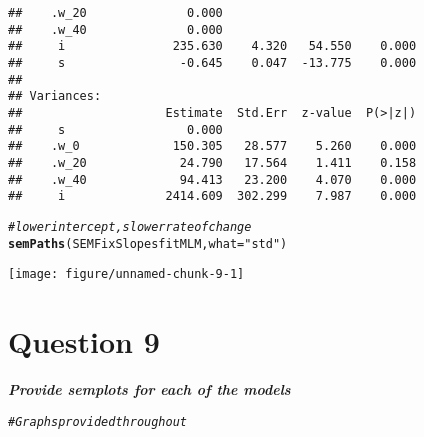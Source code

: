 \documentclass{article}\usepackage[]{graphicx}\usepackage[]{color}
\makeatletter
\def\maxwidth{ %
  \ifdim\Gin@nat@width>\linewidth
    \linewidth
  \else
    \Gin@nat@width
  \fi
}
\newcommand{\hlstr}[1]{\textcolor[rgb]{0.192,0.494,0.8}{#1}}%
\newcommand{\hlcom}[1]{\textcolor[rgb]{0.678,0.584,0.686}{\textit{#1}}}%
\newcommand{\hlstd}[1]{\textcolor[rgb]{0.345,0.345,0.345}{#1}}%
\newcommand{\hlkwc}[1]{\textcolor[rgb]{0.333,0.667,0.333}{#1}}%
\newcommand{\hlkwd}[1]{\textcolor[rgb]{0.737,0.353,0.396}{\textbf{#1}}}%
\newenvironment{kframe}{%
 \def\at@end@of@kframe{}%
 \ifinner\ifhmode%
  \def\at@end@of@kframe{\end{minipage}}%
  \begin{minipage}{\columnwidth}%
 \fi\fi%
 \def\FrameCommand##1{\hskip\@totalleftmargin \hskip-\fboxsep
 \colorbox{shadecolor}{##1}\hskip-\fboxsep
     \hskip-\linewidth \hskip-\@totalleftmargin \hskip\columnwidth}%
 \MakeFramed {\advance\hsize-\width
   \@totalleftmargin\z@ \linewidth\hsize
   \@setminipage}}%
 {\par\unskip\endMakeFramed%
 \at@end@of@kframe}
\newenvironment{knitrout}{}{} %
\makeatother
\begin{document}
\begin{knitrout}
\begin{kframe}
\begin{verbatim}
##    .w_20              0.000                           
##    .w_40              0.000                           
##     i               235.630    4.320   54.550    0.000
##     s                -0.645    0.047  -13.775    0.000
## 
## Variances:
##                    Estimate  Std.Err  z-value  P(>|z|)
##     s                 0.000                           
##    .w_0             150.305   28.577    5.260    0.000
##    .w_20             24.790   17.564    1.411    0.158
##    .w_40             94.413   23.200    4.070    0.000
##     i              2414.609  302.299    7.987    0.000
\end{verbatim}
\begin{alltt}
\hlcom{# lower intercept, slower rate of change}
\hlkwd{semPaths}\hlstd{(SEMFixSlopesfitMLM,} \hlkwc{what} \hlstd{=} \hlstr{"std"}\hlstd{)}
\end{alltt}


{\ttfamily\noindent\color{warningcolor}{\#\# Warning in qgraph(Edgelist, labels = nLab, bidirectional = Bidir, directed = Directed, : Non-finite weights are omitted}}\end{kframe}
\texttt{[image: figure/unnamed-chunk-9-1]} 

\end{knitrout}

\section{Question 9}
\textbf{\large{\textit{
Provide semplots for each of the models
}}}

\begin{knitrout}
\color{fgcolor}\begin{kframe}
\begin{alltt}
\hlcom{# Graphs provided throughout}
\end{alltt}
\end{kframe}
\end{knitrout}
\end{document}
